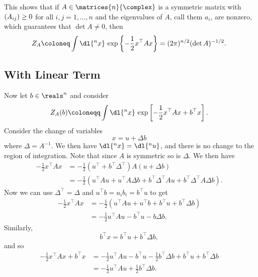 \documentclass[fleqn]{NotesClass}
\let\Re\relax
\DeclareMathOperator{\Re}{Re}
\newcommand{\trans}{{\top}}
\begin{document}
    This shows that if \(A \in \matrices{n}{\complex}\) is a symmetric matrix with \(\Re(A_{ij}) \ge 0\) for all \(i, j = 1, \dotsc, n\) and the eigenvalues of \(A\), call them \(a_i\), are nonzero, which guarantees that \(\det A \ne 0\), then
    \begin{equation}
        Z_A \coloneq \int \dl{^nx} \, \exp\left\{ -\frac{1}{2}x^\trans Ax \right\} = (2\pi)^{n/2} (\det A)^{-1/2}.
    \end{equation}
    
    \subsection{With Linear Term}
    Now let \(b \in \reals^n\) and consider
    \begin{equation}
        Z_A(b) \coloneqq \int \dl{^nx} \, \exp\left[ -\frac{1}{2} x^\trans Ax + b^\trans x \right].
    \end{equation}
    Consider the change of variables
    \begin{equation}
        x = u + \Delta b
    \end{equation}
    where \(\Delta = A^{-1}\).
    We then have \(\dl{^nx} = \dl{^nu}\), and there is no change to the region of integration.
    Note that since \(A\) is symmetric so is \(\Delta\).
    We then have
    \begin{align}
        -\frac{1}{2}x^\trans A x &= -\frac{1}{2}(u^\trans + b^\trans \Delta^\trans) A (u + \Delta b)\\
        &= -\frac{1}{2}(u^\trans A u + u^\trans A\Delta b + b^\trans \Delta^\trans A u + b^\trans \Delta^\trans A \Delta b).
    \end{align}
    Now we can use \(\Delta^\trans = \Delta\) and \(u^\trans b = u_ib_i = b^\trans u\) to get
    \begin{align}
        -\frac{1}{2} x^\trans A x &= -\frac{1}{2}(u^\trans A u + u^\trans b + b^\trans u + b^\trans \Delta b)\\
        &= -\frac{1}{2}u^\trans A u - b^\trans u - b \Delta b.
    \end{align}
    Similarly,
    \begin{equation}
        b^\trans x = b^\trans u + b^\trans \Delta b,
    \end{equation}
    and so
    \begin{align}
        -\frac{1}{2}x^\trans A x + b^\trans x &= -\frac{1}{2}u^\trans A u - b^\trans u - \frac{1}{2} b^\trans \Delta b + b^\trans u + b^\trans \Delta b\\
        &=  -\frac{1}{2} u^\trans A u + \frac{1}{2} b^\trans \Delta b.
    \end{align}
\end{document}
